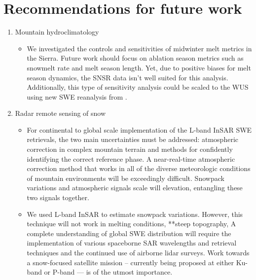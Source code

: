 \hypertarget{ch5-intro-1}{\section{Recommendations for future work}\label{ch5-intro-1}}

\begin{enumerate}
   \item Mountain hydroclimatology
   \begin{itemize}
     \item We investigated the controls and sensitivities of midwinter melt metrics in the Sierra. Future work should focus on ablation season metrics such as snowmelt rate and melt season length. Yet, due to positive biases for melt season dynamics, the SNSR data isn't well suited for this analysis. Additionally, this type of sensitivity analysis could be scaled to the WUS using new SWE reanalysis from \citep{fangWesternUnitedStates2022}.
   \end{itemize}

   \item Radar remote sensing of snow
   \begin{itemize}

     \item For continental to global scale implementation of the L-band InSAR SWE retrievals, the two main uncertainties must be addressed: atmospheric correction in complex mountain terrain and methods for confidently identifying the correct reference phase. A near-real-time atmospheric correction method that works in all of the diverse meteorologic conditions of mountain environments will be exceedingly difficult. Snowpack variations and atmospheric signals scale will elevation, entangling these two signals together.

     \item We used L-band InSAR to estimate snowpack variations. However, this technique will not work in melting conditions, **steep topography, A complete understanding of global SWE distribution will require the implementation of various spaceborne SAR wavelengths and retrieval techniques and the continued use of airborne lidar surveys. Work towards a snow-focused satellite mission -- currently being proposed at either Ku-band \citep{tsangReviewArticleGlobal2022, garnaudQuantifyingSnowMass2019} or P-band \citep{shahRemoteSensingSnow2017} --- is of the utmost importance.


\end{itemize}
\end{enumerate}
